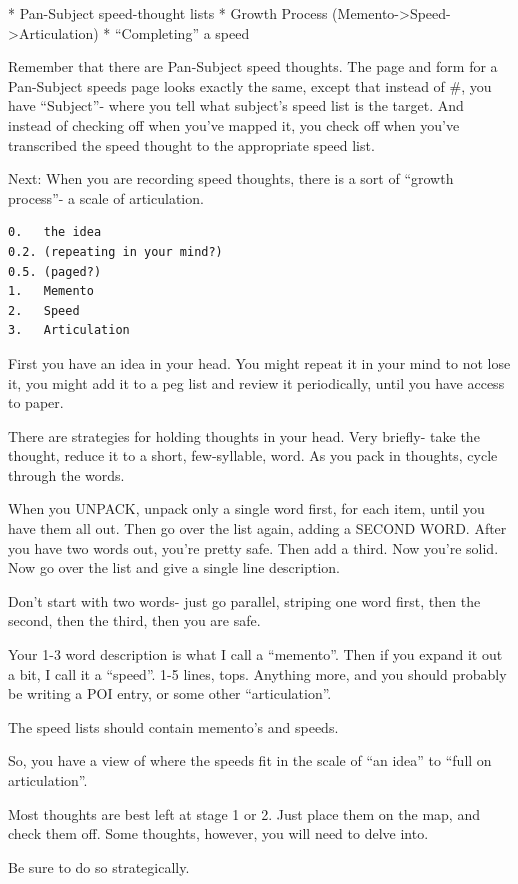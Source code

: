 \documentclass[oneside]{book}
\begin{document}
* Pan-Subject speed-thought lists
* Growth Process (Memento->Speed->Articulation)
* ``Completing'' a speed

Remember that there are Pan-Subject speed thoughts. The page and form
for a Pan-Subject speeds page looks exactly the same, except that
instead of \#, you have ``Subject''- where you tell what subject's speed
list is the target. And instead of checking off when you've mapped it,
you check off when you've transcribed the speed thought to the
appropriate speed list.

Next: When you are recording speed thoughts, there is a sort of
``growth process''- a scale of articulation.

\begin{verbatim}
0.   the idea
0.2. (repeating in your mind?)
0.5. (paged?)
1.   Memento
2.   Speed
3.   Articulation
\end{verbatim}

First you have an idea in your head. You might repeat it in your mind
to not lose it, you might add it to a peg list and review it
periodically, until you have access to paper.

There are strategies for holding thoughts in your head. Very briefly-
take the thought, reduce it to a short, few-syllable, word. As you
pack in thoughts, cycle through the words.

When you UNPACK, unpack only a single word first, for each item, until
you have them all out. Then go over the list again, adding a SECOND
WORD. After you have two words out, you're pretty safe. Then add a
third. Now you're solid. Now go over the list and give a single line
description.

Don't start with two words- just go parallel, striping one word first,
then the second, then the third, then you are safe.

Your 1-3 word description is what I call a ``memento''. Then if you
expand it out a bit, I call it a ``speed''. 1-5 lines, tops. Anything
more, and you should probably be writing a POI entry, or some other
``articulation''.

The speed lists should contain memento's and speeds.

So, you have a view of where the speeds fit in the scale of ``an idea''
to ``full on articulation''.

Most thoughts are best left at stage 1 or 2. Just place them on the
map, and check them off. Some thoughts, however, you will need to
delve into.

Be sure to do so strategically.
\end{document}

